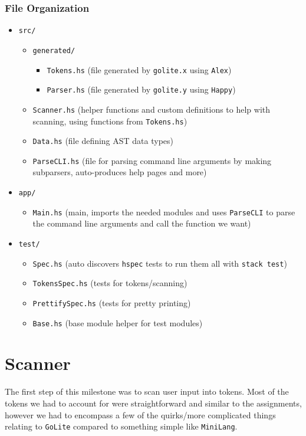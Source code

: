 \documentclass[11pt]{article}
\begin{document}
\subsubsection{File Organization}
\label{sec:org7931b2d}
\begin{itemize}
\item \texttt{src/}
\begin{itemize}
\item \texttt{generated/}
\begin{itemize}
\item \texttt{Tokens.hs} (file generated by \texttt{golite.x} using \texttt{Alex})
\item \texttt{Parser.hs} (file generated by \texttt{golite.y} using \texttt{Happy})
\end{itemize}
\item \texttt{Scanner.hs} (helper functions and custom definitions to help
with scanning, using functions from \texttt{Tokens.hs})
\item \texttt{Data.hs} (file defining AST data types)
\item \texttt{ParseCLI.hs} (file for parsing command line arguments by
making subparsers, auto-produces help pages and more)
\end{itemize}
\item \texttt{app/}
\begin{itemize}
\item \texttt{Main.hs} (main, imports the needed modules and uses
\texttt{ParseCLI} to parse the command line arguments and call the
function we want)
\end{itemize}
\item \texttt{test/}
\begin{itemize}
\item \texttt{Spec.hs} (auto discovers \texttt{hspec} tests to run them all with
\texttt{stack test})
\item \texttt{TokensSpec.hs} (tests for tokens/scanning)
\item \texttt{PrettifySpec.hs} (tests for pretty printing)
\item \texttt{Base.hs} (base module helper for test modules)
\end{itemize}
\end{itemize}
\section{Scanner}
\label{sec:org302106b}
The first step of this milestone was to scan user input into
tokens. Most of the tokens we had to account for were straightforward
and similar to the assignments, however we had to encompass a few of
the quirks/more complicated things relating to \texttt{GoLite} compared to
something simple like \texttt{MiniLang}.
\end{document}
